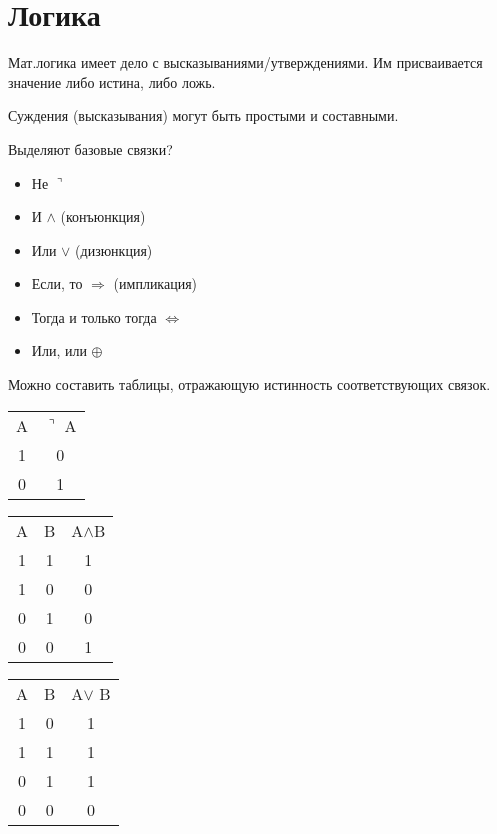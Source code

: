 \section{Логика}

Мат.логика имеет дело с высказываниями/утверждениями. Им присваивается значение либо истина, либо ложь.

Суждения (высказывания) могут быть простыми и составными.

Выделяют базовые связки?
\begin{itemize}
    \item Не $\urcorner$
    \item И $\wedge$ (конъюнкция)
    \item Или $\vee$ (дизюнкция)
    \item Если, то $\Longrightarrow$ (импликация)
    \item Тогда и только тогда $\Leftrightarrow$
    \item Или, или $\oplus$
\end{itemize}

Можно составить таблицы, отражающую истинность соответствующих связок.

\begin{table}[h]
    \begin{subtable}[t]{0.2\textwidth}
        \begin{tabular}[h]{c c}
            A & $\urcorner$ A \\
            1 & 0 \\
            0 & 1 \\
        \end{tabular}
    \end{subtable}
    \begin{subtable}[t]{0.2\textwidth}
        \begin{tabular}[t]{c c c}
            A & B & A$\wedge$B \\
            1 & 1 & 1 \\
            1 & 0 & 0\\
            0 & 1 & 0 \\
            0 & 0 & 1
        \end{tabular}
    \end{subtable}
    \begin{subtable}[t]{0.2\textwidth}
        \begin{tabular}[t]{c c c}
            A & B & A$\vee$ B \\
            1 & 0 & 1 \\
            1 & 1 & 1 \\
            0 & 1 & 1 \\
            0 & 0 & 0
        \end{tabular}
    \end{subtable}
\end{table}

